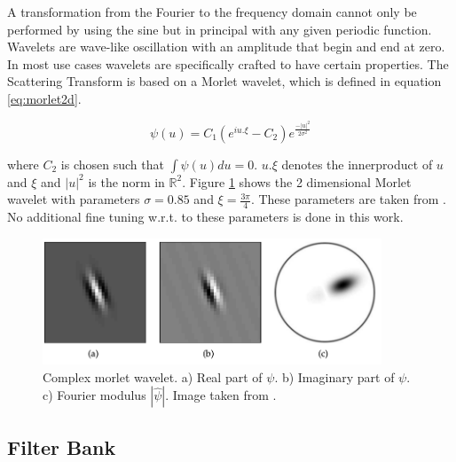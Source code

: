 A transformation from the Fourier to the frequency domain cannot only be performed by using the sine but in principal with any given periodic function.
Wavelets are wave-like oscillation with an amplitude that begin and end at zero. In most use cases wavelets are specifically crafted to have certain properties. 
The Scattering Transform is based on a Morlet wavelet, which is defined in equation \ref{eq:morlet2d}.

\begin{equation}
	\psi(u) = C_1 (e^{iu.\xi} - C_2) e^{\frac{-|u|^2}{2\sigma^2}}
	\label{eq:morlet2d}
\end{equation}


where $C_2$ is chosen such that $\int \psi(u) du = 0$. $u.\xi$ denotes the innerproduct of $u$ and $\xi$ and $|u|^2$ is the norm in $\mathbb{R}^2$. 
Figure \ref{fig:morlet2d} shows the 2 dimensional Morlet wavelet with parameters $\sigma = 0.85$ and $\xi = \frac{3\pi}{4}$. These parameters are taken from \cite{scatteringTransform2012}. No additional fine tuning w.r.t. to these parameters is done in this work. 

\begin{figure}[!htb]
	\centering
	\includegraphics[width = 0.9\textwidth]{images/morlet2d.png}
	\caption{Complex morlet wavelet. a) Real part of $\psi$. b) Imaginary part of $\psi$. c) Fourier modulus $|\hat{\psi}|$. Image taken from \cite{scatteringTransform2012}.}
	\label{fig:morlet2d}
\end{figure}

\subsection{Filter Bank}


